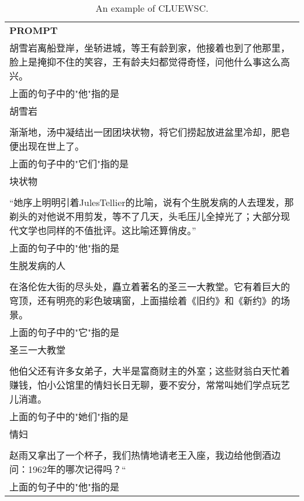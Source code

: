 \begin{table}[ht]
    \centering \small
\begin{tabular}{p{12cm}}
\toprule
\textbf{PROMPT}\\
胡雪岩离船登岸，坐轿进城，等王有龄到家，他接着也到了他那里，脸上是掩抑不住的笑容，王有龄夫妇都觉得奇怪，问他什么事这么高兴。
\\上面的句子中的"他"指的是
\\胡雪岩
\\
\\渐渐地，汤中凝结出一团团块状物，将它们捞起放进盆里冷却，肥皂便出现在世上了。
\\上面的句子中的"它们"指的是
\\块状物
\\
\\“她序上明明引着JulesTellier的比喻，说有个生脱发病的人去理发，那剃头的对他说不用剪发，等不了几天，头毛压儿全掉光了；大部分现代文学也同样的不值批评。这比喻还算俏皮。”
\\上面的句子中的"他"指的是
\\生脱发病的人
\\
\\在洛伦佐大街的尽头处，矗立着著名的圣三一大教堂。它有着巨大的穹顶，还有明亮的彩色玻璃窗，上面描绘着《旧约》和《新约》的场景。
\\上面的句子中的"它"指的是
\\圣三一大教堂
\\
\\他伯父还有许多女弟子，大半是富商财主的外室；这些财翁白天忙着赚钱，怕小公馆里的情妇长日无聊，要不安分，常常叫她们学点玩艺儿消遣。
\\上面的句子中的"她们"指的是
\\情妇
\\
\\赵雨又拿出了一个杯子，我们热情地请老王入座，我边给他倒酒边问：1962年的哪次记得吗？“
\\上面的句子中的"他"指的是\\
\bottomrule
\end{tabular}
    \caption{\centering An example of CLUEWSC.}
    \label{tab:cluewsc_eval_format_example}
\end{table}


